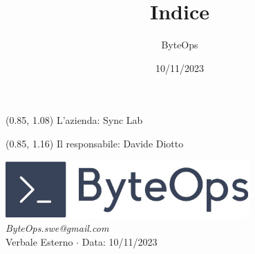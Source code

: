 \documentclass{article}
\title{\textbf{\fontsize{28}{6}\selectfont Indice}} \author{\fontsize{14}{6}\selectfont ByteOps}
\date{10/11/2023}
\begin{document}

\begin{textblock*}{\textwidth}(0.85\textwidth, 1.08\textheight)
L'azienda: Sync Lab
\end{textblock*}

\begin{textblock*}{\textwidth}(0.85\textwidth, 1.16\textheight)
Il responsabile: Davide Diotto
\end{textblock*}

\pagestyle{fancy}
\begin{center}
\includegraphics[width = 0.7\textwidth]{../../../Images/logo.png} \\
\vspace{0.2cm}
\textcolor[RGB]{60, 60, 60}{\textit{ByteOps.swe@gmail.com}} \\ \vspace{1cm}
\fontsize{16}{6}\selectfont Verbale Esterno $\cdot$ Data: 10/11/2023 \\ \vspace{0.5cm}
\end{center}
\end{document}
